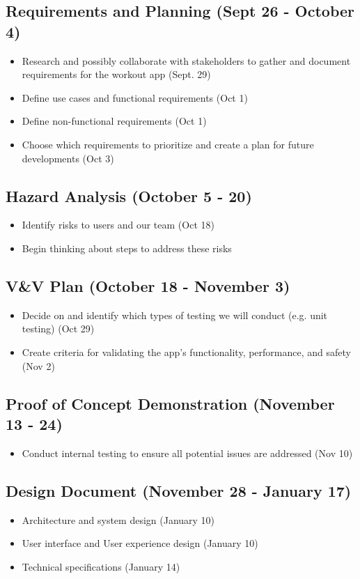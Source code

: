 \documentclass{article}
\begin{document}
	\subsection{Requirements and Planning (Sept 26 - October 4)}
	\begin{itemize}
		\item Research and possibly collaborate with stakeholders to gather and document requirements for the workout app (Sept. 29)
		\item Define use cases and functional requirements (Oct 1)
		\item Define non-functional requirements (Oct 1)
		\item Choose which requirements to prioritize and create a plan for future developments (Oct 3)
	\end{itemize}

	\subsection{Hazard Analysis (October 5 - 20)}
	\begin{itemize}
		\item Identify risks to users and our team (Oct 18)
		\item Begin thinking about steps to address these risks
	\end{itemize}

	\subsection{V\&V Plan (October 18 - November 3)}
	\begin{itemize}
		\item Decide on and identify which types of testing we will conduct (e.g. unit testing) (Oct 29)
		\item Create criteria for validating the app’s functionality, performance, and safety (Nov 2)
	\end{itemize}

	\subsection{Proof of Concept Demonstration (November 13 - 24)}
	\begin{itemize}
		\item Conduct internal testing to ensure all potential issues are addressed (Nov 10)
	\end{itemize}

	\subsection{Design Document (November 28 - January 17)}
	\begin{itemize}
		\item Architecture and system design (January 10)
		\item User interface and User experience design (January 10)
		\item Technical specifications (January 14)
	\end{itemize}
\end{document}
